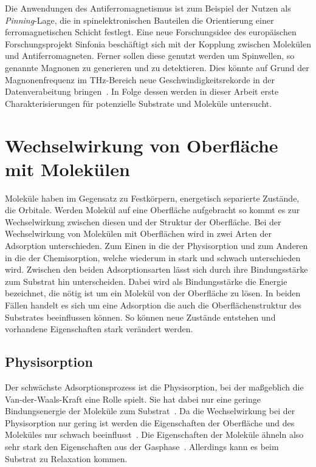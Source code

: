         Die Anwendungen des Antiferromagnetismus ist zum Beispiel der Nutzen als \textit{Pinning}-Lage, die in spinelektronischen Bauteilen die Orientierung einer ferromagnetischen Schicht festlegt.
        Eine neue Forschungsidee des europäischen Forschungsprojekt Sinfonia beschäftigt sich mit der Kopplung zwischen Molekülen und Antiferromagneten.
        Ferner sollen diese genutzt werden um Spinwellen, so genannte Magnonen zu generieren und zu detektieren.
        Dies könnte auf Grund der Magnonenfrequenz im \si{\tera\hertz}-Bereich neue Geschwindigkeitsrekorde in der Datenverabeitung bringen~\cite{SINFONIA}.
        In Folge dessen werden in dieser Arbeit erste Charakterisierungen für potenzielle Substrate und Moleküle untersucht.
                
    
    \section{Wechselwirkung von Oberfläche mit Molekülen} \label{sec:WW}
        Moleküle haben im Gegensatz zu Festkörpern, energetisch separierte Zustände, die Orbitale.
        Werden Molekül auf eine Oberfläche aufgebracht so kommt es zur Wechselwirkung zwischen diesen und der Struktur der Oberfläche.
        Bei der Wechselwirkung von Molekülen mit Oberflächen wird in zwei Arten der Adsorption unterschieden. 
        Zum Einen in die der Physisorption und zum Anderen in die der Chemisorption, welche wiederum in stark und schwach unterschieden wird.
        Zwischen den beiden Adsorptionsarten lässt sich durch ihre Bindungsstärke zum Substrat hin unterscheiden.
        Dabei wird als Bindungsstärke die Energie bezeichnet, die nötig ist um ein Molekül von der Oberfläche zu lösen.
        In beiden Fällen handelt es sich um eine Adsorption die auch die Oberflächenstruktur des Substrates beeinflussen können.
        So können neue Zustände entstehen und vorhandene Eigenschaften stark verändert werden.
        
        \subsection{Physisorption}
            Der schwächste Adsorptionsprozess ist die Physisorption, bei der maßgeblich die Van-der-Waals-Kraft eine Rolle spielt.
            Sie hat dabei nur eine geringe Bindungsenergie der Moleküle zum Substrat~\cite{IF_16}.
            Da die Wechselwirkung bei der Physisorption nur gering ist werden die Eigenschaften der Oberfläche und des Moleküles nur schwach beeinflusst~\cite{bergenti_spinterface_2019}.
            Die Eigenschaften der Moleküle ähneln also sehr stark den Eigenschaften aus der Gasphase~\cite{IF_16}.
            Allerdings kann es beim Substrat zu Relaxation kommen.

